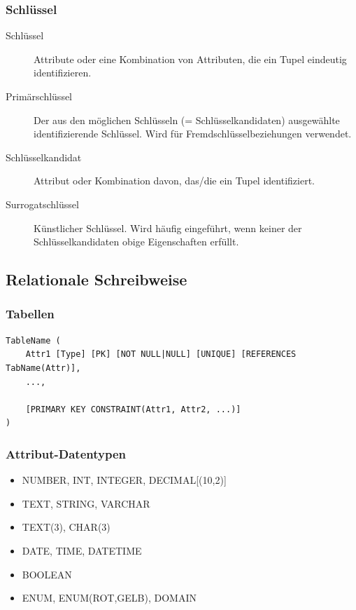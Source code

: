     \subsubsection{Schlüssel}
    \begin{description}
        \item[Schlüssel] Attribute oder eine Kombination von Attributen, die ein Tupel eindeutig identifizieren.
        \item[Primärschlüssel] Der aus den möglichen Schlüsseln (= Schlüsselkandidaten) ausgewählte identifizierende Schlüssel. Wird für Fremdschlüsselbeziehungen verwendet.
        \item[Schlüsselkandidat] Attribut oder Kombination davon, das/die ein Tupel identifiziert.
        \item[Surrogatschlüssel] Künstlicher Schlüssel. Wird häufig eingeführt, wenn keiner der Schlüsselkandidaten obige Eigenschaften erfüllt.
    \end{description}
    \subsection{Relationale Schreibweise}
        \subsubsection{Tabellen}
            \begin{lstlisting}
TableName (
    Attr1 [Type] [PK] [NOT NULL|NULL] [UNIQUE] [REFERENCES TabName(Attr)],
    ...,
    
    [PRIMARY KEY CONSTRAINT(Attr1, Attr2, ...)]
)
            \end{lstlisting}
            \subsubsection{Attribut-Datentypen}
                \begin{itemize}
                  \item NUMBER, INT, INTEGER, DECIMAL[(10,2)]
                  \item TEXT, STRING, VARCHAR
                  \item TEXT(3), CHAR(3)
                  \item DATE, TIME, DATETIME
                  \item BOOLEAN
                  \item ENUM, ENUM(ROT,GELB), DOMAIN
                \end{itemize}
